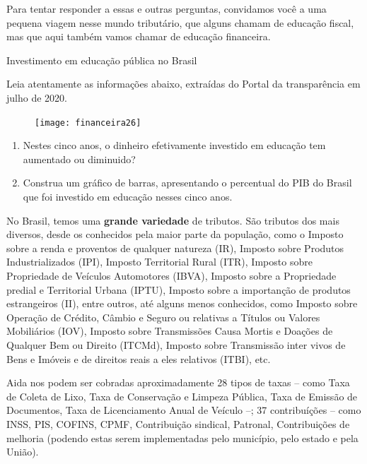 Para tentar responder a essas e outras perguntas, convidamos você a uma pequena viagem nesse mundo tributário, que alguns chamam de educação fiscal, mas que aqui também vamos chamar de educação financeira.

\begin{task}{Investimento em educação pública no Brasil}

Leia atentamente as informações abaixo, extraídas do Portal da transparência em julho de 2020.

\begin{figure}[H]
\centering

\texttt{[image: financeira26]}
\end{figure}

\begin{enumerate}
  \item Nestes cinco anos, o dinheiro efetivamente investido em educação tem aumentado ou diminuido?
  \item Construa um gráfico de barras, apresentando o percentual do PIB do Brasil que foi investido em educação nesses cinco anos.
\end{enumerate}

\end{task}

\begin{knowledge}
No Brasil, temos uma \textbf{grande variedade} de tributos. São tributos dos mais diversos, desde os conhecidos pela maior parte da população, como o Imposto sobre a renda e proventos de qualquer natureza (IR), Imposto sobre Produtos Industrializados (IPI), Imposto Territorial Rural (ITR), Imposto sobre Propriedade de Veículos Automotores (IBVA), Imposto sobre a Propriedade predial e Territorial Urbana (IPTU), Imposto sobre a importanção de produtos estrangeiros (II), entre outros, até alguns menos conhecidos, como Imposto sobre Operação de Crédito, Câmbio e Seguro ou relativas a Títulos ou Valores Mobiliários (IOV), Imposto sobre Transmissões Causa Mortis e Doações de Qualquer Bem ou Direito (ITCMd), Imposto sobre Transmissão inter vivos de Bens e Imóveis e de direitos reais a eles relativos (ITBI), etc.

Aida nos podem ser cobradas aproximadamente 28 tipos de taxas -- como Taxa de Coleta de Lixo, Taxa de Conservação e Limpeza Pública, Taxa de Emissão de Documentos, Taxa de Licenciamento Anual de Veículo --; 37 contribuíções -- como INSS, PIS, COFINS, CPMF, Contribuição sindical, Patronal, Contribuições de melhoria (podendo estas serem implementadas pelo município, pelo estado e pela União).
\end{knowledge}

